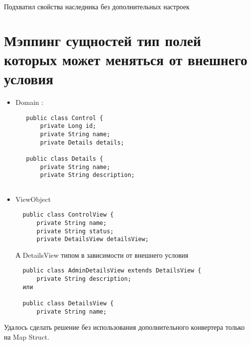 \documentclass{article}
\begin{document}
  Подхватил свойства наследника без дополнительных настроек
  
  \section{Мэппинг сущностей тип полей которых может меняться от внешнего условия}
  \begin{itemize}
   \item Domain :
   \begin{lstlisting} 
   public class Control {  
       private Long id;   
       private String name;  
       private Details details;   
   
   public class Details {
       private String name;
       private String description;
   
    \end{lstlisting}
   \item ViewObject
   \begin{lstlisting} 
  public class ControlView {
      private String name;
      private String status;
      private DetailsView detailsView;
  \end{lstlisting}
  А DetailsView типом в зависимости от внешнего условия
  \begin{lstlisting} 
  public class AdminDetailsView extends DetailsView {
      private String description;
  или
  
  public class DetailsView {
      private String name;
    \end{lstlisting}
   \end{itemize}
   
   Удалось сделать решение без использования дополнительного конвертера только на Map Struct.
   
\end{document}
